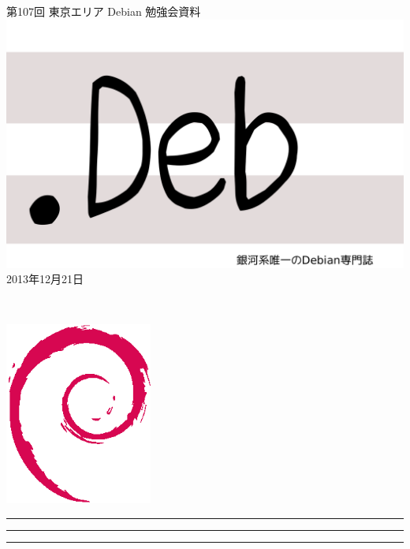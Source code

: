 \documentclass[mingoth,a4paper]{jsarticle}
\newcommand{\debmtgyear}{2013}
\newcommand{\debmtgmonth}{12}
\newcommand{\debmtgdate}{21}
\newcommand{\debmtgnumber}{107}
\begin{document}
\begin{titlepage}
\thispagestyle{empty}

\vspace*{-2cm}
第\debmtgnumber{}回 東京エリア Debian 勉強会資料\\
\hspace*{-2cm}
\includegraphics{image2012-natsu/dotdeb.pdf}\\
\hfill{}\debmtgyear{}年\debmtgmonth{}月\debmtgdate{}日

\\

\vspace*{-2cm}
\hfill{}\includegraphics[height=6cm]{image200502/openlogo-nd.eps}
\end{titlepage}

\newpage

\begin{minipage}[b]{0.2\hsize}
 \colorbox{titleback}{}
\end{minipage}
\begin{minipage}[b]{0.8\hsize}
\hrule
\vspace{2mm}
\hrule
\begin{multicols}{2}
\tableofcontents
\end{multicols}
\vspace{2mm}
\hrule
\end{minipage}
\end{document}
